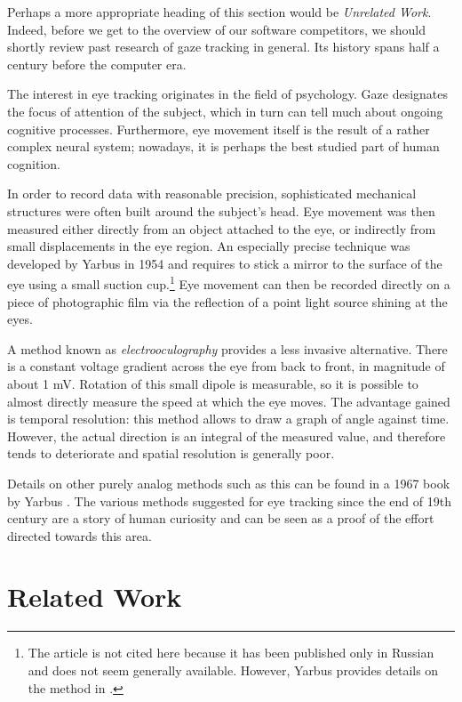 Perhaps a more appropriate heading of this section would be \textit{Unrelated Work}.
Indeed, before we get to the overview of our software competitors, we should shortly review past research of gaze tracking in general.
Its history spans half a century before the computer era.

The interest in eye tracking originates in the field of psychology.
Gaze designates the focus of attention of the subject, which in turn can tell much about ongoing cognitive processes.
Furthermore, eye movement itself is the result of a rather complex neural system; nowadays, it is perhaps the best studied part of human cognition.

In order to record data with reasonable precision, sophisticated mechanical structures were often built around the subject's head.
Eye movement was then measured either directly from an object attached to the eye, or indirectly from small displacements in the eye region.
An especially precise technique was developed by Yarbus in 1954 and requires to stick a mirror to the surface of the eye using a small suction cup.\footnote{
The article is not cited here because it has been published only in Russian and does not seem generally available.
However, Yarbus provides details on the method in \cite{yarbus1967}.
}
Eye movement can then be recorded directly on a piece of photographic film via the reflection of a point light source shining at the eyes.

A method known as \textit{electrooculography} provides a less invasive alternative.
There is a constant voltage gradient across the eye from back to front, in magnitude of about 1 mV.
Rotation of this small dipole is measurable, so it is possible to almost directly measure the speed at which the eye moves.
The advantage gained is temporal resolution: this method allows to draw a graph of angle against time.
However, the actual direction is an integral of the measured value, and therefore tends to deteriorate and spatial resolution is generally poor.

Details on other purely analog methods such as this can be found in a 1967 book by Yarbus \cite{yarbus1967}.
The various methods suggested for eye tracking since the end of 19th century are a story of human curiosity and can be seen as a proof of the effort directed towards this area.

\section{Related Work}

